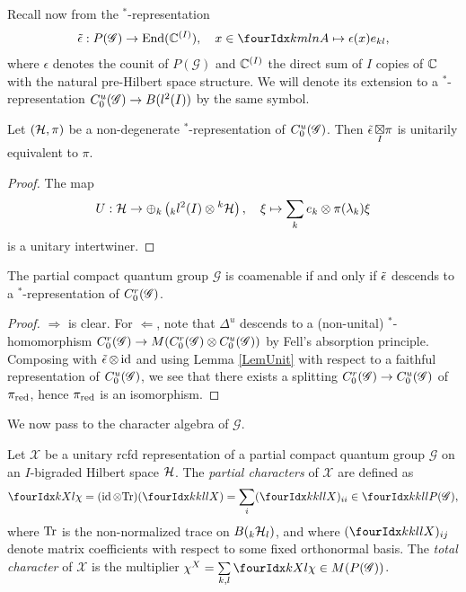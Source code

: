 Recall now from \cite{DCT1} the $^*$-representation 
\begin{align} \label{eq:weps}
  \weps: P(\mathscr{G}) \rightarrow \End(\C^{(I)}), \quad x\in
  \Gr{A}{k}{l}{m}{n}\mapsto \epsilon(x) e_{kl},
\end{align}
where $\epsilon$ denotes the counit of $P(\mathscr{G})$ and $\mathbb{C}^{(I)}$ the direct sum of $I$ copies of $\mathbb{C}$ with the natural pre-Hilbert space structure. We will denote its extension to a $^*$-representation $C^{u}_{0}(\mathscr{G})\rightarrow B(l^2(I))$ by the same symbol.

\begin{Lem}\label{LemUnit} Let $(\mathcal{H},\pi)$ be a non-degenerate $^*$-representation of $C^{u}_{0}(\mathscr{G})$. Then $\operatorname{\tilde{\epsilon}}\underset{I}{\boxtimes} \pi$ is unitarily equivalent to $\pi$.
\end{Lem} 
\begin{proof} The map \[U: \mathcal{H} \rightarrow \oplus_k \left({}_kl^2(I)\otimes {}^k\mathcal{H}\right),\quad \xi \mapsto \sum_k e_k\otimes \pi(\lambda_k)\xi\] is a unitary intertwiner.
\end{proof} 

\begin{Prop} The partial compact quantum group $\mathscr{G}$ is coamenable if and only if $\operatorname{\tilde{\epsilon}}$ descends to a $^*$-representation of $C^{r}_{0}(\mathscr{G})$.
\end{Prop} 
\begin{proof} $\Rightarrow$ is clear. For $\Leftarrow$, note that $\Delta^u$ descends to a (non-unital) $^*$-homomorphism $C^{r}_{0}(\mathscr{G})\rightarrow M(C^{r}_{0}(\mathscr{G})\otimes C^{u}_{0}(\mathscr{G}))$ by Fell's absorption principle. Composing with $\operatorname{\tilde{\epsilon}}\otimes \operatorname{id}$ and using Lemma \ref{LemUnit} with respect to a faithful representation of $C^{u}_{0}(\mathscr{G})$, we see that there exists a splitting $C^{r}_{0}(\mathscr{G})\rightarrow C^{u}_{0}(\mathscr{G})$ of $\pi_{\operatorname{\mathrm{red}}}$, hence $\pi_{\operatorname{\mathrm{red}}}$ is an isomorphism.
\end{proof}
 
We now pass to the character algebra of $\mathscr{G}$.
 
 \begin{Def} Let $\mathscr{X}$ be a unitary rcfd representation of a partial compact quantum group $\mathscr{G}$ on an $I$-bigraded Hilbert space $\mathcal{H}$. The \emph{partial characters} of $\mathscr{X}$ are defined as \[\Gr{\chi}{}{X}{k}{l} = (\id\otimes \Tr)(\Gr{X}{k}{l}{k}{l}) = \sum_i(\Gr{X}{k}{l}{k}{l})_{ii} \in \Gr{P(\mathscr{G})}{k}{l}{k}{l},\] where $\mathrm{Tr}$ is the non-normalized trace on $B({}_{k}\mathcal{H}_{l})$, and where $(\Gr{X}{k}{l}{k}{l})_{ij}$ denote matrix coefficients with respect to some fixed orthonormal basis. The \emph{total character} of $\mathscr{X}$ is the multiplier $\chi^X  =\underset{k,l}{\sum} \,\Gr{\chi}{}{X}{k}{l}\in M(P(\mathscr{G}))$.
 \end{Def}

